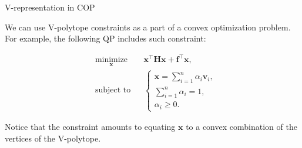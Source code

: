\documentclass{beamer}
\begin{document}
\begin{frame}{V-representation in COP}
	\begin{flushleft}
		
		We can use V-polytope constraints as a part of a convex optimization problem. For example, the following QP includes such constraint:
		
		\begin{equation}
			\begin{aligned}
				& \underset{\mathbf{x}}{\text{minimize}}
				& & \mathbf{x}^\top \mathbf{H} \mathbf{x} + \mathbf{f}^\top\mathbf{x}, \\
				& \text{subject to}
				& & \begin{cases}
					\mathbf{x} = \sum\limits_{i=1}^{n} \alpha_i  \mathbf{v}_i, \\
					\sum\limits_{i=1}^{n} \alpha_i = 1, \\
					\alpha_i \geq 0.
				\end{cases}
			\end{aligned}
		\end{equation}
		
		Notice that the constraint amounts to equating $\mathbf{x}$ to a convex combination of the vertices of the V-polytope.
		
	\end{flushleft}
\end{frame}
\end{document}
